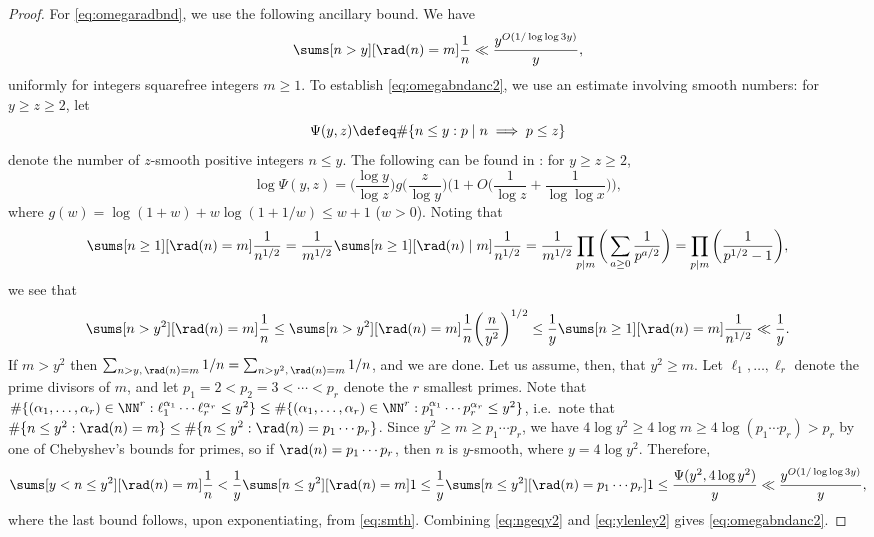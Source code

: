 \documentclass[12pt, reqno, twoside, letterpaper]{amsart}
\begin{document}
\begin{proof}
For \eqref{eq:omegaradbnd}, we use the following ancillary bound.
%
We have 
\begin{equation}
 \label{eq:omegabndanc2}
  \sums[n > y][\rad(n) = m] \frac{1}{n} 
   \ll
    \frac{y^{O(1/\log\log 3y)}}{y}, 
\end{equation}
uniformly for integers squarefree integers $m \ge 1$.
%
To establish \eqref{eq:omegabndanc2}, we use an estimate involving 
smooth numbers: for $y \ge z \ge 2$, let 
\[
 \Psi(y,z) \defeq \#\{n \le y : p \mid n \implies p \le z\} 
\]
denote the number of $z$-smooth positive integers $n \le y$.
%
The following can be found in \cite[(1.19)]{GRA:08a}: for 
$y \ge z \ge 2$,    
\begin{equation}
 \label{eq:smth}
  \log \Psi(y,z)
   =
    \bigg(\frac{\log y}{\log z}\bigg)
    g\bigg(\frac{z}{\log y}\bigg)
      \bigg(1 + O\bigg(\frac{1}{\log z} + \frac{1}{\log\log x}\bigg)\bigg),
\end{equation}
where $g(w) = \log(1 + w) + w\log(1 + 1/w) \le w + 1$ ($w > 0$).
%
Noting that 
\[
 \sums[n \ge 1][\rad(n) = m] 
  \frac{1}{n^{1/2}}
   =
    \frac{1}{m^{1/2}}
     \sums[n \ge 1][\rad(n) \mid m] \frac{1}{n^{1/2}}
      =
       \frac{1}{m^{1/2}}
        \prod_{p \mid m}
         \bigg(\sum_{a \ge 0} \frac{1}{p^{a/2}}\bigg)
         =
          \prod_{p \mid m} \bigg(\frac{1}{p^{1/2} - 1}\bigg),
\]
we see that 
\begin{equation}
 \label{eq:ngeqy2}
  \sums[n > y^2][\rad(n) = m] \frac{1}{n}
   \le 
    \sums[n > y^2][\rad(n) = m] 
     \frac{1}{n}\bigg(\frac{n}{y^{2}}\bigg)^{1/2}
      \le 
       \frac{1}{y}
        \sums[n \ge 1][\rad(n) = m] 
         \frac{1}{n^{1/2}}
          \ll
           \frac{1}{y}.
\end{equation}
%
If $m > y^2$ then 
$
 \sum_{n > y, \, \rad(n) = m} 1/n 
  = 
   \sum_{n > y^2, \, \rad(n) = m} 1/n
$, and we are done.
%
Let us assume, then, that $y^2 \ge m$.
%
Let $\ell_1,\ldots,\ell_r$ denote the prime divisors 
of $m$, and let $p_1 = 2 < p_2 = 3 < \cdots < p_r$ 
denote the $r$ smallest primes.
%
Note that 
$
 \#\{(\alpha_1,\ldots,\alpha_r) \in \NN^r :
       \ell_1^{\alpha_1}\cdots \ell_r^{\alpha_r} \le y^2\}
   \le 
    \#\{(\alpha_1,\ldots,\alpha_r) \in \NN^r :
       p_1^{\alpha_1}\cdots p_r^{\alpha_r} \le y^2\}
$, i.e.\ note that 
$
 \#\{n \le y^2 : \rad(n) = m\}
  \le 
   \#\{n \le y^2 : \rad(n) = p_1\cdots p_r\}
$.
%
Since $y^2 \ge m \ge p_1\cdots p_r$,  
we have $4\log y^2 \ge 4\log m \ge 4\log (p_1\cdots p_r) > p_r$ by 
one of Chebyshev's bounds for primes, so if 
$\rad(n) = p_1\cdots p_r$, then $n$ is $y$-smooth, where 
$y = 4\log y^2$.
%
Therefore, 
\begin{equation}
 \label{eq:ylenley2}
 \sums[y < n \le y^2][\rad(n) = m] \frac{1}{n}
  <
   \frac{1}{y}
    \sums[n \le y^2][\rad(n) = m] 1
     \le 
      \frac{1}{y}
       \sums[n \le y^2][\rad(n) = p_1\cdots p_r] 1
        \le 
         \frac{\Psi(y^2,4\log y^2)}{y}
          \ll 
           \frac{y^{O(1/\log\log 3y)}}{y},
\end{equation}
where the last bound follows, upon exponentiating, from 
\eqref{eq:smth}.
%
Combining \eqref{eq:ngeqy2} and \eqref{eq:ylenley2} gives 
\eqref{eq:omegabndanc2}.


\end{proof}
\end{document}
